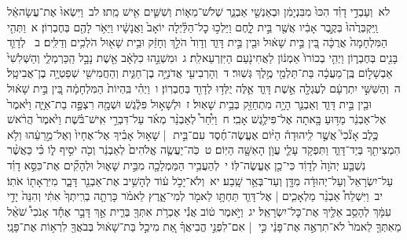 \documentclass[18pt]{article}
\newcommand{\kri}[1]{\Afootnote{#1}}	%
\begin{document}
 {\loc לא~}וְעַבְדֵ֣י דָוִ֗ד הִכּוּ֙ מִבִּנְיָמִ֔ן וּבְאַנְשֵׁ֖י אַבְנֵ֑ר שְׁלֹשׁ־מֵא֧וֹת וְשִׁשִּׁ֛ים אִ֖ישׁ מֵֽתוּ׃ \startlock
 {\loc לב~}וַיִּשְׂאוּ֙ אֶת־עֲשָׂהאֵ֔ל וַֽיִּקְבְּרֻ֙הוּ֙ בְּקֶ֣בֶר אָבִ֔יו אֲשֶׁ֖ר בֵּ֣ית לָ֑חֶם וַיֵּלְכ֣וּ כׇל־הַלַּ֗יְלָה יוֹאָב֙ וַאֲנָשָׁ֔יו וַיֵּאֹ֥ר לָהֶ֖ם בְּחֶבְרֽוֹן׃ 
\startlock
 {\loc א~}וַתְּהִ֤י הַמִּלְחָמָה֙ אֲרֻכָּ֔ה בֵּ֚ין בֵּ֣ית שָׁא֔וּל וּבֵ֖ין בֵּ֣ית דָּוִ֑ד וְדָוִד֙ הֹלֵ֣ךְ וְחָזֵ֔ק וּבֵ֥ית שָׁא֖וּל הֹלְכִ֥ים וְדַלִּֽים׃ \startlock
 {\loc ב~}\edtext{(וילדו)}{\kri{קרי: וַיִּוָּלְד֧וּ}}  לְדָוִ֛ד בָּנִ֖ים בְּחֶבְר֑וֹן וַיְהִ֤י בְכוֹרוֹ֙ אַמְנ֔וֹן לַאֲחִינֹ֖עַם הַיִּזְרְעֵאלִֽת׃ \startlock
 {\loc ג~}וּמִשְׁנֵ֣הוּ כִלְאָ֔ב  \edtext{(לאביגל)}{\kri{קרי: לַאֲבִיגַ֕יִל}}  אֵ֖שֶׁת נָבָ֣ל הַֽכַּרְמְלִ֑י וְהַשְּׁלִשִׁי֙ אַבְשָׁל֣וֹם בֶּֽן־מַעֲכָ֔ה בַּת־תַּלְמַ֖י מֶ֥לֶךְ גְּשֽׁוּר׃ \startlock
 {\loc ד~}וְהָרְבִיעִ֖י אֲדֹנִיָּ֣ה בֶן־חַגִּ֑ית וְהַחֲמִישִׁ֖י שְׁפַטְיָ֥ה בֶן־אֲבִיטָֽל׃ \startlock
 {\loc ה~}וְהַשִּׁשִּׁ֣י יִתְרְעָ֔ם לְעֶגְלָ֖ה אֵ֣שֶׁת דָּוִ֑ד אֵ֛לֶּה יֻלְּד֥וּ לְדָוִ֖ד בְּחֶבְרֽוֹן׃ \startlock
 {\loc ו~}וַיְהִ֗י בִּֽהְיוֹת֙ הַמִּלְחָמָ֔ה בֵּ֚ין בֵּ֣ית שָׁא֔וּל וּבֵ֖ין בֵּ֣ית דָּוִ֑ד וְאַבְנֵ֛ר הָיָ֥ה מִתְחַזֵּ֖ק בְּבֵ֥ית שָׁאֽוּל׃ \startlock
 {\loc ז~}וּלְשָׁא֣וּל פִּלֶ֔גֶשׁ וּשְׁמָ֖הּ רִצְפָּ֣ה בַת־אַיָּ֑ה וַיֹּ֙אמֶר֙ אֶל־אַבְנֵ֔ר מַדּ֥וּעַ בָּ֖אתָה אֶל־פִּילֶ֥גֶשׁ אָבִֽי׃ \startlock
 {\loc ח~}וַיִּ֩חַר֩ לְאַבְנֵ֨ר מְאֹ֜ד עַל־דִּבְרֵ֣י אִֽישׁ־בֹּ֗שֶׁת וַיֹּ֙אמֶר֙ הֲרֹ֨אשׁ כֶּ֥לֶב אָנֹ֘כִי֮ אֲשֶׁ֣ר לִֽיהוּדָה֒ הַיּ֨וֹם אֶעֱשֶׂה־חֶ֜סֶד עִם־בֵּ֣ית  |  שָׁא֣וּל אָבִ֗יךָ אֶל־אֶחָיו֙ וְאֶל־מֵ֣רֵעֵ֔הוּ וְלֹ֥א הִמְצִיתִ֖ךָ בְּיַד־דָּוִ֑ד וַתִּפְקֹ֥ד עָלַ֛י עֲוֺ֥ן הָאִשָּׁ֖ה הַיּֽוֹם׃ \startlock
 {\loc ט~}כֹּֽה־יַעֲשֶׂ֤ה אֱלֹהִים֙ לְאַבְנֵ֔ר וְכֹ֖ה יֹסִ֣יף ל֑וֹ כִּ֗י כַּאֲשֶׁ֨ר נִשְׁבַּ֤ע יְהֹוָה֙ לְדָוִ֔ד כִּי־כֵ֖ן אֶעֱשֶׂה־לּֽוֹ׃ \startlock
 {\loc י~}לְהַעֲבִ֥יר הַמַּמְלָכָ֖ה מִבֵּ֣ית שָׁא֑וּל וּלְהָקִ֞ים אֶת־כִּסֵּ֣א דָוִ֗ד עַל־יִשְׂרָאֵל֙ וְעַל־יְהוּדָ֔ה מִדָּ֖ן וְעַד־בְּאֵ֥ר שָֽׁבַע׃ \startlock
 {\loc יא~}וְלֹא־יָכֹ֣ל ע֔וֹד לְהָשִׁ֥יב אֶת־אַבְנֵ֖ר דָּבָ֑ר מִיִּרְאָת֖וֹ אֹתֽוֹ׃ \startlock
 {\loc יב~}וַיִּשְׁלַח֩ אַבְנֵ֨ר מַלְאָכִ֧ים  |  אֶל־דָּוִ֛ד תַּחְתָּ֥ו לֵאמֹ֖ר לְמִי־אָ֑רֶץ לֵאמֹ֗ר כָּרְתָ֤ה בְרִֽיתְךָ֙ אִתִּ֔י וְהִנֵּה֙ יָדִ֣י עִמָּ֔ךְ לְהָסֵ֥ב אֵלֶ֖יךָ אֶת־כׇּל־יִשְׂרָאֵֽל׃ \startlock
 {\loc יג~}וַיֹּ֣אמֶר ט֔וֹב אֲנִ֕י אֶכְרֹ֥ת אִתְּךָ֖ בְּרִ֑ית אַ֣ךְ דָּבָ֣ר אֶחָ֡ד אָנֹכִי֩ שֹׁאֵ֨ל מֵאִתְּךָ֤ לֵאמֹר֙ לֹא־תִרְאֶ֣ה אֶת־פָּנַ֔י כִּ֣י  |  אִם־לִפְנֵ֣י הֱבִיאֲךָ֗ אֵ֚ת מִיכַ֣ל בַּת־שָׁא֔וּל בְּבֹאֲךָ֖ לִרְא֥וֹת אֶת־פָּנָֽי׃ \startlock
\end{document}
